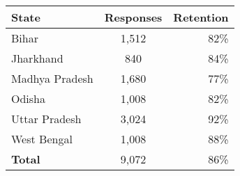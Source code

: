 \begin{tabular}{lcr} %
\textbf{State} & \textbf{Responses} & \textbf{Retention} \\
\hline
Bihar & 1,512 & 82\% \\
Jharkhand & 840 & 84\% \\
Madhya Pradesh & 1,680 & 77\% \\
Odisha & 1,008 & 82\% \\
Uttar Pradesh & 3,024 & 92\% \\ 
West Bengal & 1,008 & 88\% \\
\hline
\textbf{Total} & 9,072 & 86\% \\
\end{tabular}

